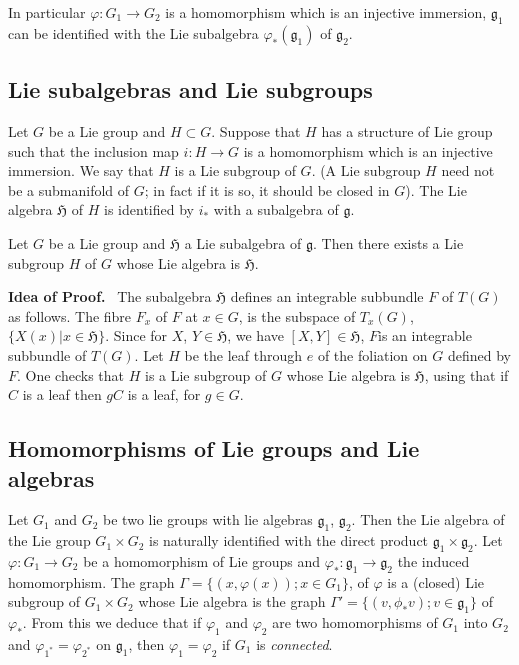 In particular $\varphi:G_{1}\to G_{2}$ is a homomorphism which is an injective immersion, $\mathfrak{g}_{1}$ can be identified with the Lie subalgebra $\varphi_{*}(\mathfrak{g}_{1})$ of $\mathfrak{g}_{2}$.

\subsection*{Lie subalgebras and Lie subgroups}

Let $G$ be a Lie group and $H\subset G$. Suppose that $H$ has a structure of Lie group such that the inclusion map $i:H\to G$ is a homomorphism which is an injective immersion. We say that $H$ is a Lie subgroup of $G$. (A Lie subgroup $H$ need not be a submanifold of $G$; in fact if it is so, it should be closed in $G$). The Lie algebra $\mathfrak{H}$ of $H$ is identified by $i_{*}$ with a subalgebra of $\mathfrak{g}$.

\begin{proposition}\label{sec9-prop9.1}
Let $G$ be a Lie group and $\mathfrak{H}$ a Lie subalgebra of $\mathfrak{g}$. Then there exists a Lie subgroup $H$ of $G$ whose Lie algebra is $\mathfrak{H}$.
\end{proposition}

\noindent
{\bf Idea of Proof.}~ The subalgebra $\mathfrak{H}$ defines an integrable subbundle $F$ of $T(G)$ as follows. The fibre $F_{x}$ of $F$ at $x\in G$, is the subspace of $T_{x}(G)$, $\{X(x)|x\in \mathfrak{H}\}$. Since for $X$, $Y\in \mathfrak{H}$, we have $[X,Y]\in \mathfrak{H}$, $F$\pageoriginale is an integrable subbundle of $T(G)$. Let $H$ be the leaf through $e$ of the foliation on $G$ defined by $F$. One checks that $H$ is a Lie subgroup of $G$ whose Lie algebra is $\mathfrak{H}$, using that if $C$ is a leaf then $gC$ is a leaf, for $g\in G$.

\subsection*{Homomorphisms of Lie groups and Lie algebras}

Let $G_{1}$ and $G_{2}$ be two lie groups with lie algebras $\mathfrak{g}_{1}$, $\mathfrak{g}_{2}$. Then the Lie algebra of the Lie group $G_{1}\times G_{2}$ is naturally identified with the direct product $\mathfrak{g}_{1}\times \mathfrak{g}_{2}$. Let $\varphi : G_{1}\to G_{2}$ be a homomorphism of Lie groups and $\varphi_{*}:\mathfrak{g}_{1}\to \mathfrak{g}_{2}$ the induced homomorphism. The graph $\Gamma=\{(x,\varphi(x));x\in G_{1}\}$, of $\varphi$ is a (closed) Lie subgroup of $G_{1}\times G_{2}$ whose Lie algebra is the graph $\Gamma'=\{(v,\phi_{*}v);v\in \mathfrak{g}_{1}\}$ of $\varphi_{*}$. From this we deduce that if $\varphi_{1}$ and $\varphi_{2}$ are two homomorphisms of $G_{1}$ into $G_{2}$ and $\varphi_{1^{*}}=\varphi_{2^{*}}$ on $\mathfrak{g}_{1}$, then $\varphi_{1}=\varphi_{2}$ if $G_{1}$ is {\em connected}.

